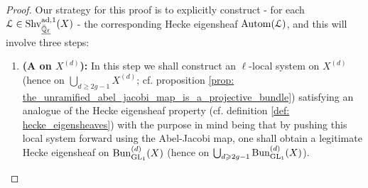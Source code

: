             \begin{proof}
                Our strategy for this proof is to explicitly construct - for each $\mathcal{L} \in \mathrm{Shv}_{\underline{\bar{\mathbb{Q}}_{\ell}}}^{\mathrm{ad}, 1}(X)$ - the corresponding Hecke eigensheaf $\mathrm{Autom}(\mathcal{L})$, and this will involve three steps:
                    \begin{enumerate}
                        \item \textbf{(A  on $X^{(d)}$):} In this step we shall construct an $\ell$-local system on $X^{(d)}$ (hence on $\bigcup_{d \geq 2g - 1} X^{(d)}$; cf. proposition \ref{prop: the_unramified_abel_jacobi_map_is_a_projective_bundle}) satisfying an analogue of the Hecke eigensheaf property (cf. definition \ref{def: hecke_eigensheaves}) with the purpose in mind being that by pushing this local system forward using the Abel-Jacobi map, one shall obtain a legitimate Hecke eigensheaf on $\mathrm{Bun}_{\operatorname{GL}_1}^{(d)}(X)$ (hence on $\bigcup_{d \geqslant 2g - 1} \mathrm{Bun}_{\operatorname{GL}_1}^{(d)}(X)$).
                        

\end{enumerate}
\end{proof}
